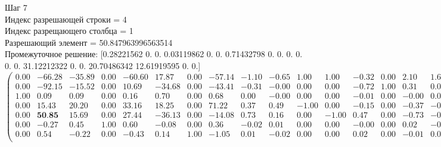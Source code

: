 \documentclass[draft]{article}
\begin{document}
\begin{flushleft}
    Шаг 7 \\
    Индекс разрешающей строки = 4\\
    Индекс разрещающего столбца = 1\\
    Разрешающий элемент = 50.847963996563514\\
    Промежуточное решение:
    [0.28221562  0.  0.  0.03119862  0.  0.  0.71432798  0.  0.  0.  0.  0.  0.  31.12212322  0.  0.  20.70486342  12.61919595  0.  0.]
\begin{equation*}
\begin{pmatrix}
    0.00 & -66.28 & -35.89 & 0.00 & -60.60 &  17.87 & 0.00 & -57.14 & -1.10 & -0.65 &  1.00 &  1.00 & -0.32 & 0.00 &  2.10 &  1.65 & 0.00 & 0.00 &  1.32 &  1.00 & -33.32 \\
    0.00 & -92.15 & -15.52 & 0.00 &  10.69 & -34.68 & 0.00 & -43.41 & -0.31 & -0.00 &  0.00 &  0.00 & -0.72 & 1.00 &  0.31 &  0.00 & 0.00 & 0.00 &  0.72 & -1.00 &  31.12 \\
    1.00 &   0.09 &   0.09 & 0.00 &   0.16 &   0.70 & 0.00 &   0.68 &  0.00 & -0.00 &  0.00 &  0.00 & -0.01 & 0.00 & -0.00 &  0.00 & 0.00 & 0.00 &  0.01 &  0.00 &   0.28 \\
    0.00 &  15.43 &  20.20 & 0.00 &  33.16 &  18.25 & 0.00 &  71.22 &  0.37 &  0.49 & -1.00 &  0.00 & -0.15 & 0.00 & -0.37 & -0.49 & 1.00 & 0.00 &  0.15 &  0.00 &  20.70 \\
    0.00 &  \textbf{50.85} &  15.69 & 0.00 &  27.44 & -36.13 & 0.00 & -14.08 &  0.73 &  0.16 &  0.00 & -1.00 &  0.47 & 0.00 & -0.73 & -0.16 & 0.00 & 1.00 & -0.47 &  0.00 &  12.62 \\
    0.00 &  -0.27 &   0.45 & 1.00 &   0.60 &  -0.08 & 0.00 &   0.36 & -0.02 &  0.01 &  0.00 &  0.00 & -0.00 & 0.00 &  0.02 & -0.01 & 0.00 & 0.00 &  0.00 &  0.00 &   0.03 \\
    0.00 &   0.54 &  -0.22 & 0.00 &  -0.43 &   0.14 & 1.00 &  -1.05 &  0.01 & -0.02 &  0.00 &  0.00 &  0.02 & 0.00 & -0.01 &  0.02 & 0.00 & 0.00 & -0.02 &  0.00 &   0.71 \\
\end{pmatrix}
\end{equation*}
\end{flushleft}
\end{document}
